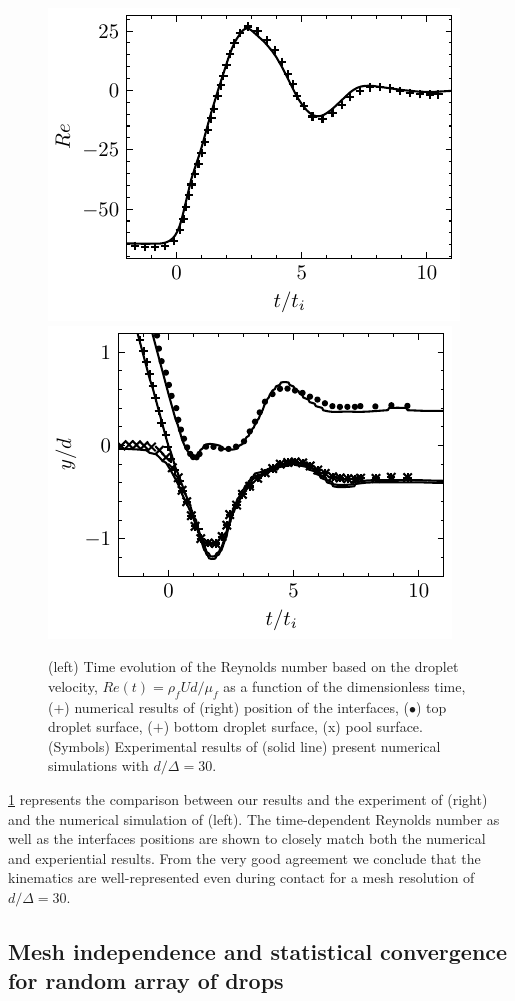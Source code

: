 \begin{figure}[h!]
    \centering
    \includegraphics[height = 0.3\textwidth]{image/VALIDATION2.0/Longmire/Re.pdf}
    \includegraphics[height = 0.3\textwidth]{image/VALIDATION2.0/Longmire/Dist.pdf}
    \caption{(left) Time evolution of the Reynolds number based on the droplet velocity, $Re(t) = \rho_fU d /\mu_f$ as a function of the dimensionless time, (+) numerical results of  \citet{balcazar2015multiple} (right)  position of the interfaces, ($\bullet$) top droplet surface, ($+$) bottom droplet surface, (x) pool surface. (Symbols) Experimental results of \citet{mohamed2003drop} (solid line) present numerical simulations with $d/\Delta = 30$. }
    \label{fig:resultslong}
\end{figure}
\ref{fig:resultslong} represents the comparison between our results and the experiment of \citet{mohamed2003drop} (right) and the numerical simulation of \citet{balcazar2015multiple} (left). 
The time-dependent Reynolds number as well as the interfaces positions are shown to closely match both the numerical and experiential results. 
From the very good agreement we conclude that the kinematics are well-represented even during contact for a mesh resolution of $d/\Delta = 30$.

\subsection*{Mesh independence and statistical convergence for random array of drops}

